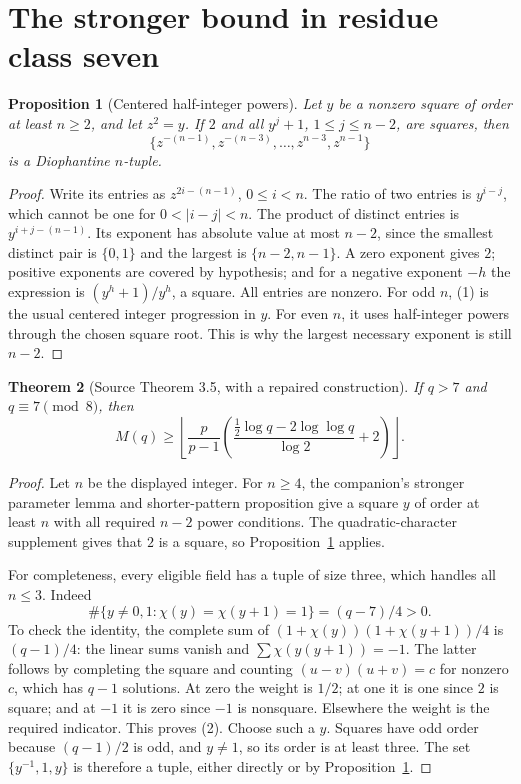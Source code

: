 \documentclass[11pt,a4paper]{article}
\newtheorem{theorem}{Theorem}
\newtheorem{proposition}[theorem]{Proposition}
\begin{document}
\section{The stronger bound in residue class seven}
\begin{proposition}[Centered half-integer powers]\label{centered}
Let $y$ be a nonzero square of order at least $n\ge2$, and let
$z^2=y$. If $2$ and all $y^j+1$, $1\le j\le n-2$, are squares,
then
\[
 \{z^{-(n-1)},z^{-(n-3)},\ldots,z^{n-3},z^{n-1}\}
 \tag{1}
\]
is a Diophantine $n$-tuple.
\end{proposition}
\begin{proof}
Write its entries as $z^{2i-(n-1)}$, $0\le i<n$.
The ratio of two entries is $y^{i-j}$, which cannot be one for
$0<|i-j|<n$. The product of distinct entries is
$y^{i+j-(n-1)}$. Its exponent has absolute value at most $n-2$,
since the smallest distinct pair is $\{0,1\}$ and the largest is
$\{n-2,n-1\}$. A zero exponent gives $2$; positive exponents are
covered by hypothesis; and for a negative exponent $-h$ the expression
is $(y^h+1)/y^h$, a square. All entries are nonzero.
For odd $n$, (1) is the usual centered integer progression in $y$.
For even $n$, it uses half-integer powers through the chosen square root.
This is why the largest necessary exponent is still $n-2$.
\end{proof}

\begin{theorem}[Source Theorem 3.5, with a repaired construction]\label{plus-two}
If $q>7$ and $q\equiv7\pmod8$, then
\[
 M(q)\ge\left\lfloor\frac p{p-1}
 \left(\frac{\frac12\log q-2\log\log q}{\log2}+2\right)\right\rfloor.
\]
\end{theorem}
\begin{proof}
Let $n$ be the displayed integer. For $n\ge4$, the companion's
stronger parameter lemma and shorter-pattern proposition give a square
$y$ of order at least $n$ with all required $n-2$ power conditions.
The quadratic-character supplement gives that $2$ is a square, so
Proposition~\ref{centered} applies.

For completeness, every eligible field has a tuple of size three,
which handles all $n\le3$. Indeed
\[
 \#\{y\ne0,1:\chi(y)=\chi(y+1)=1\}=(q-7)/4>0.
 \tag{2}
\]
To check the identity, the complete sum of
$(1+\chi(y))(1+\chi(y+1))/4$ is $(q-1)/4$:
the linear sums vanish and $\sum\chi(y(y+1))=-1$.
The latter follows by completing the square and counting
$(u-v)(u+v)=c$ for nonzero $c$, which has $q-1$ solutions.
At zero the weight is $1/2$; at one it is one since $2$ is square;
and at $-1$ it is zero since $-1$ is nonsquare. Elsewhere the weight
is the required indicator. This proves (2).
Choose such a $y$. Squares have odd order because $(q-1)/2$ is odd,
and $y\ne1$, so its order is at least three.
The set $\{y^{-1},1,y\}$ is therefore a tuple, either directly or by
Proposition~\ref{centered}.
\end{proof}
\end{document}
